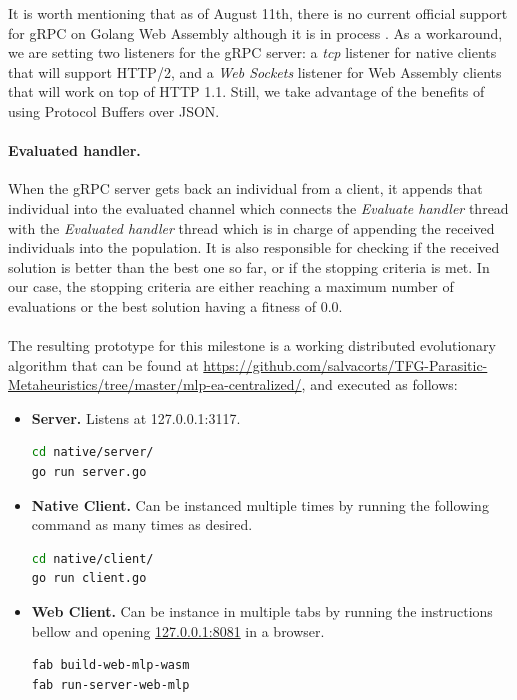 It is worth mentioning that as of August 11th, there is no current official support for gRPC on Golang Web Assembly although it is in process \cite{grpc-wasm-issue}. As a workaround, we are setting two listeners for the gRPC server: a \textit{tcp} listener for native clients that will support HTTP/2, and a \textit{Web Sockets} listener for Web Assembly clients that will work on top of HTTP 1.1. Still, we take advantage of the benefits of using Protocol Buffers over JSON.

\paragraph*{Evaluated handler.} When the gRPC server gets back an individual from a client, it appends that individual into the evaluated channel which connects the \textit{Evaluate handler} thread with the \textit{Evaluated handler} thread which is in charge of appending the received individuals into the population. It is also responsible for checking if the received solution is better than the best one so far, or if the stopping criteria is met. In our case, the stopping criteria are either reaching a maximum number of evaluations or the best solution having a fitness of 0.0.

\paragraph*{}
The resulting prototype for this milestone is a working distributed evolutionary algorithm that can be found at \href{github.com/salvacorts/TFG-Parasitic-Metaheuristics/tree/master/mlp-ea-centralized/common}{https://github.com/salvacorts/TFG-Parasitic-Metaheuristics/tree/master/mlp-ea-centralized/}, and executed as follows:

\begin{itemize}
	\item \textbf{Server.} Listens at 127.0.0.1:3117.
\begin{lstlisting}[language=bash]
cd native/server/
go run server.go
\end{lstlisting}

	\item \textbf{Native Client.} Can be instanced multiple times by running the following command as many times as desired.
\begin{lstlisting}[language=bash]
cd native/client/
go run client.go
\end{lstlisting}

	\item \textbf{Web Client.} Can be instance in multiple tabs by running the instructions bellow and opening \href{127.0.0.1:8081}{127.0.0.1:8081} in a browser.
\begin{lstlisting}[language=bash]
fab build-web-mlp-wasm
fab run-server-web-mlp
\end{lstlisting}
\end{itemize}

